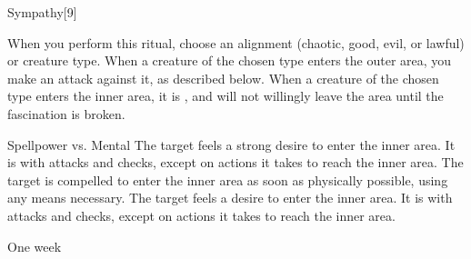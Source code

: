 \begin{spellsection}{Sympathy}[9]
    \begin{spellheader}
    \end{spellheader}
    \begin{spellcontent}
        \begin{spelltargetinginfo}
            \spellrng{\rngclose}
        \end{spelltargetinginfo}
        \begin{spelleffects}
            \spellspecial When you perform this ritual, choose an alignment (chaotic, good, evil, or lawful) or creature type.
            \spelleffect When a creature of the chosen type enters the outer area, you make an attack against it, as described below.
            When a creature of the chosen type enters the inner area, it is \fascinated, and will not willingly leave the area until the fascination is broken.
            \begin{spellattack}{Spellpower vs. Mental}
                \spellsuccess The target feels a strong desire to enter the inner area.
                It is \severelyimpaired with attacks and checks, except on actions it takes to reach the inner area.
                \spellcritical The target is compelled to enter the inner area as soon as physically possible, using any means necessary.
                \spellfailure The target feels a desire to enter the inner area.
                It is \impaired with attacks and checks, except on actions it takes to reach the inner area.
            \end{spellattack}
            \spelldur One week
        \end{spelleffects}
    \end{spellcontent}
    \begin{spellfooter}
    \end{spellfooter}
    \begin{spellaugments}
    \end{spellaugments}
\end{spellsection}

